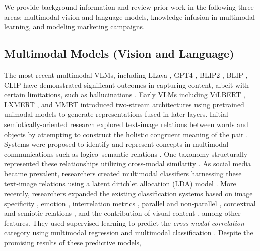 We provide background information and review prior work in the following three areas: multimodal vision and language models, knowledge infusion in multimodal learning, and modeling marketing campaigns. 

\subsection{Multimodal Models (Vision and Language)}
\label{sec:multimodal-transformers}

The most recent multimodal VLMs, including LLava \cite{liu2023visual}, GPT4 \cite{openai2023gpt4}, BLIP2 \cite{li2023blip}, BLIP \cite{li2022blip}, CLIP \cite{radford2021learning} have demonstrated significant outcomes in capturing content, albeit with certain limitations, such as hallucinations \cite{li2023evaluating,cirik2022holm}. Early VLMs including ViLBERT \cite{lu2019vilbert}, LXMERT \cite{tan2019lxmert}, and MMBT \cite{kiela2019supervised} introduced two-stream architectures using pretrained unimodal models to generate representations fused in later layers. Initial semiotically-oriented research explored text-image relations between 
words and objects 
by attempting to construct the holistic congruent meaning of the pair \cite{wu2014multimodal,manning1998understanding}. %
Systems were proposed to identify and represent concepts in multimodal communications such as logico–semantic relations \cite{martinec2005system}. One taxonomy 
structurally represented these relationships utilizing cross-modal similarity \cite{marsh2003taxonomy}. As social media became prevalent, researchers created multimodal classifiers harnessing these text-image relations using a latent dirichlet allocation (LDA) model \cite{wang2014bilateral,chen2013understanding}.  
More recently, researchers expanded the existing classification systems based on image specificity \cite{jas2015image}, emotion \cite{chen2015velda}, interrelation metrics \cite{henning2017estimating,otto2020characterization}, parallel and non-parallel \cite{zhang2018equal}, contextual and semiotic relations \cite{kruk2019integrating}, and the contribution of visual content \cite{vempala2019categorizing},  among other features. They used supervised learning to predict the \emph{cross-modal correlation} category using multimodal regression \cite{jas2015image} and multimodal classification \cite{chen2015velda,henning2017estimating,otto2020characterization,zhang2018equal,kruk2019integrating,vempala2019categorizing}. Despite the promising results of these predictive models, 
